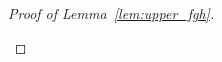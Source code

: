 \documentclass[lettersize,journal]{IEEEtran}
\theoremstyle{definition}
\theoremstyle{definition}
\newcommand{\of}[1]{\left(#1\right)}
\begin{document}
\begin{proof}[Proof of Lemma~\ref{lem:upper_fgh}]
\begin{enumerate}
    
    

\end{enumerate}
\end{proof}
\end{document}
